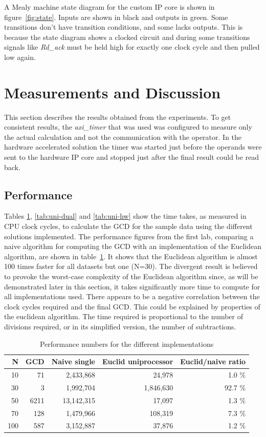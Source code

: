 \documentclass[11pt]{article}
\begin{document}
A Mealy machine state diagram for the custom IP core is shown in figure~\ref{fig:state}. Inputs are shown in black and outputs in green. Some transitions don't have transition conditions, and some lacks outputs. This is because the state diagram shows a clocked circuit and during some transitions signals like \emph{Rd\_ack} must be held high for exactly one clock cycle and then pulled low again.

\section{Measurements and Discussion\label{sec:measurements}}
This section describes the results obtained from the experiments. To get consistent results, the \emph{axi\_timer} that was used was configured to measure only the actual calculation and not the communication with the operator. In the hardware accelerated solution the timer was started just before the operands were sent to the hardware IP core and stopped just after the final result could be read back.

\subsection{Performance}
Tables \ref{tab:naive-uni}, \ref{tab:uni-dual} and \ref{tab:uni-hw} show the time takes, as measured in CPU clock cycles, to calculate the GCD for the sample data\cite{assignments} using the different solutions implemented. The performance figures from the first lab, comparing a naive algorithm for computing the GCD with an implementation of the Euclidean algorithm, are shown in table~\ref{tab:naive-uni}. It shows that the Euclidean algorithm is almost 100 times faster for all datasets but one (N=30). The divergent result is believed to provoke the worst-case complexity of the Euclidean algorithm since, as will be demonstrated later in this section, it takes significantly more time to compute for all implementations used. There appears to be a negative correlation between the clock cycles required and the final GCD. This could be explained by properties of the euclidean algorithm. The time required is proportional to the number of divisions required, or in its simplified version, the number of subtractions.

\begin{table}
  \centering
   \begin{tabular}{rr|rrr}
     \toprule
     N & GCD & Naive single & Euclid uniprocessor & Euclid/naive ratio \\
     \midrule
     10 & 71 & 2,433,868 & 24,978 & 1.0 \% \\
     30 & 3 & 1,992,704 & 1,846,630 & 92.7 \% \\
     50 & 6211 & 13,142,315 & 17,097 & 1.3 \% \\
     70 & 128 & 1,479,966 & 108,319 & 7.3 \% \\
     100 & 587 & 3,152,887 & 37,876 & 1.2 \% \\
     \bottomrule
   \end{tabular}
   \caption{Performance numbers for the different implementations}
   \label{tab:naive-uni}
\end{table}
\end{document}
